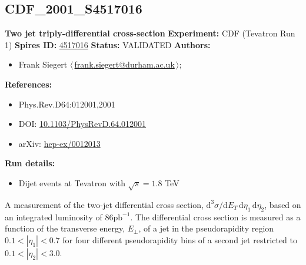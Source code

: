 \subsection[CDF\_2001\_S4517016]{CDF\_2001\_S4517016\,\cite{Affolder:2000ew}}
\textbf{Two jet triply-differential cross-section}\newline
\textbf{Experiment:} CDF (Tevatron Run 1) \newline
\textbf{Spires ID:} \href{http://www.slac.stanford.edu/spires/find/hep/www?rawcmd=key+4517016}{4517016}\newline
\textbf{Status:} VALIDATED\newline
\textbf{Authors:}
\begin{itemize}
  \item Frank Siegert $\langle\,$\href{mailto:frank.siegert@durham.ac.uk}{frank.siegert@durham.ac.uk}$\,\rangle$;
\end{itemize}
\textbf{References:}
\begin{itemize}
  \item Phys.Rev.D64:012001,2001
  \item DOI: \href{http://dx.doi.org/10.1103/PhysRevD.64.012001}{10.1103/PhysRevD.64.012001}
  \item arXiv: \href{http://arxiv.org/abs/hep-ex/0012013}{hep-ex/0012013}
\end{itemize}
\textbf{Run details:}
\begin{itemize}

  \item Dijet events at Tevatron with $\sqrt{s}=1.8$ TeV\end{itemize}

\noindent A measurement of the two-jet differential cross section,  $\mathrm{d}^3\sigma/\mathrm{d}E_T \, \mathrm{d}\eta_1 \, \mathrm{d}\eta_2$, based on an integrated luminosity of $86 \mathrm{pb}^{-1}$. The differential cross section is measured as a function of the transverse energy, $E_\perp$, of a jet in the pseudorapidity region $0.1 < |\eta_1| < 0.7$ for four different pseudorapidity bins of a second jet restricted to $0.1 < |\eta_2| < 3.0$.

\clearpage


\clearpage

